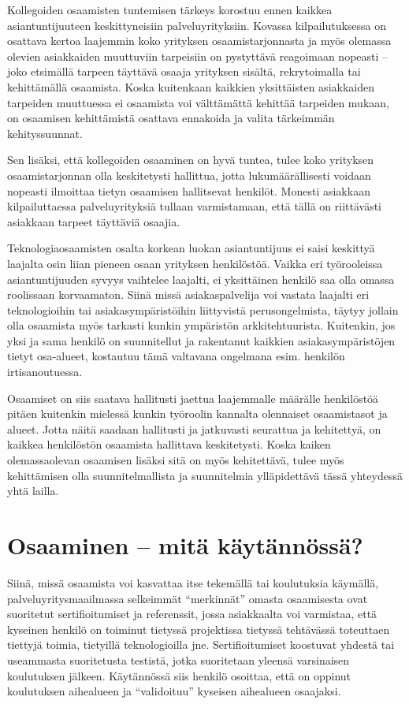 \documentclass[a4paper,finnish,12pt]{article}
\begin{document}
Kollegoiden osaamisten tuntemisen tärkeys korostuu ennen kaikkea asiantuntijuuteen keskittyneisiin palveluyrityksiin. Kovassa kilpailutuksessa on osattava kertoa laajemmin koko yrityksen osaamistarjonnasta ja myös olemassa olevien asiakkaiden muuttuviin tarpeisiin on pystyttävä reagoimaan nopeasti -- joko etsimällä tarpeen täyttävä osaaja yrityksen sisältä, rekrytoimalla tai kehittämällä osaamista. Koska kuitenkaan kaikkien yksittäisten asiakkaiden tarpeiden muuttuessa ei osaamista voi välttämättä kehittää tarpeiden mukaan, on osaamisen kehittämistä osattava ennakoida ja valita tärkeimmän kehityssuunnat.

Sen lisäksi, että kollegoiden osaaminen on hyvä tuntea, tulee koko yrityksen osaamistarjonnan olla keskitetysti hallittua, jotta lukumäärällisesti voidaan nopeasti ilmoittaa tietyn osaamisen hallitsevat henkilöt. Monesti asiakkaan kilpailuttaessa palveluyrityksiä tullaan varmistamaan, että tällä on riittävästi asiakkaan tarpeet täyttäviä osaajia.

Teknologiaosaamisten osalta korkean luokan asiantuntijuus ei saisi keskittyä laajalta osin liian pieneen osaan yrityksen henkilöstöä. Vaikka eri työrooleissa asiantuntijuuden syvyys vaihtelee laajalti, ei yksittäinen henkilö saa olla omassa roolissaan korvaamaton. Siinä missä asiakaspalvelija voi vastata laajalti eri teknologioihin tai asiakasympäristöihin liittyvistä perusongelmista, täytyy jollain olla osaamista myös tarkasti kunkin ympäristön arkkitehtuurista. Kuitenkin, jos yksi ja sama henkilö on suunnitellut ja rakentanut kaikkien asiakasympäristöjen tietyt osa-alueet, kostautuu tämä valtavana ongelmana esim. henkilön irtisanoutuessa.

Osaamiset on siis saatava hallitusti jaettua laajemmalle määrälle henkilöstöä pitäen kuitenkin mielessä kunkin työroolin kannalta olennaiset osaamistasot ja alueet. Jotta näitä saadaan hallitusti ja jatkuvasti seurattua ja kehitettyä, on kaikkea henkilöstön osaamista hallittava keskitetysti. Koska kaiken olemassaolevan osaamisen lisäksi sitä on myös kehitettävä, tulee myös kehittämisen olla suunnitelmallista ja suunnitelmia ylläpidettävä tässä yhteydessä yhtä lailla.

\clearpage

\section{Osaaminen -- mitä käytännössä?}

Siinä, missä osaamista voi kasvattaa itse tekemällä tai koulutuksia käymällä, palveluyritysmaailmassa selkeimmät ``merkinnät'' omasta osaamisesta ovat suoritetut sertifioitumiset ja referenssit, jossa asiakkaalta voi varmistaa, että kyseinen henkilö on toiminut tietyssä projektissa tietyssä tehtävässä toteuttaen tiettyjä toimia, tietyillä teknologioilla jne. Sertifioitumiset koostuvat yhdestä tai useammasta suoritetusta testistä, jotka suoritetaan yleensä varsinaisen koulutuksen jälkeen. Käytännössä siis henkilö osoittaa, että on oppinut koulutuksen aihealueen ja ``validoituu'' kyseisen aihealueen osaajaksi.
\end{document}
